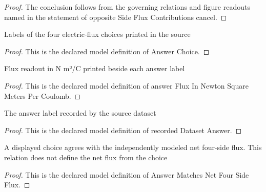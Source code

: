 \begin{proof}
  The conclusion follows from the governing relations and figure readouts named in the statement of opposite Side Flux Contributions cancel.
\end{proof}
\begin{definition}
  \label{def:physics:phyx-mini-0850:phyxminiproblems-problemphyxmini0850-answerchoice}
  Labels of the four electric-flux choices printed in the source
\end{definition}
\begin{proof}
  This is the declared model definition of Answer Choice.
\end{proof}
\begin{definition}
  \label{def:physics:phyx-mini-0850:phyxminiproblems-problemphyxmini0850-answerfluxinnewtonsquaremeterspercoulomb}
  Flux readout in N m²/C printed beside each answer label
\end{definition}
\begin{proof}
  This is the declared model definition of answer Flux In Newton Square Meters Per Coulomb.
\end{proof}
\begin{definition}
  \label{def:physics:phyx-mini-0850:phyxminiproblems-problemphyxmini0850-recordeddatasetanswer}
  The answer label recorded by the source dataset
\end{definition}
\begin{proof}
  This is the declared model definition of recorded Dataset Answer.
\end{proof}
\begin{definition}
  \label{def:physics:phyx-mini-0850:phyxminiproblems-problemphyxmini0850-answermatchesnetfoursideflux}
  A displayed choice agrees with the independently modeled net four-side flux. This relation does not define the net flux from the choice
\end{definition}
\begin{proof}
  This is the declared model definition of Answer Matches Net Four Side Flux.
\end{proof}
